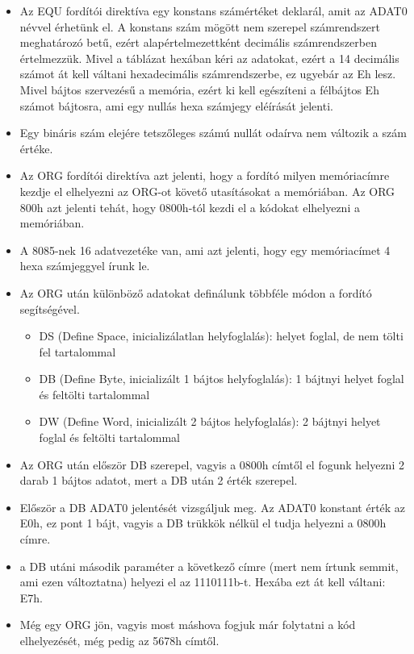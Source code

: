 \documentclass{article}
\begin{document}
\begin{itemize}
	\item Az EQU fordítói direktíva egy konstans számértéket deklarál, amit az ADAT0 névvel érhetünk el. A konstans szám mögött nem szerepel számrendszert meghatározó betű, ezért alapértelmezettként decimális számrendszerben értelmezzük. Mivel a táblázat hexában kéri az adatokat, ezért a 14 decimális számot át kell váltani hexadecimális számrendszerbe, ez ugyebár az Eh lesz. Mivel bájtos szervezésű a memória, ezért ki kell egészíteni a félbájtos Eh számot bájtosra, ami egy nullás hexa számjegy eléírását jelenti.
	\item \colorbox{orange!30}{Egy bináris szám elejére tetszőleges számú nullát odaírva nem változik a szám értéke.}
	\item Az ORG fordítói direktíva azt jelenti, hogy a fordító milyen memóriacímre kezdje el elhelyezni az ORG-ot követő utasításokat a memóriában. Az ORG 800h azt jelenti tehát, hogy 0800h-tól kezdi el a kódokat elhelyezni a memóriában.
	\item \colorbox{orange!30}{A 8085-nek 16 adatvezetéke van, ami azt jelenti, hogy egy memóriacímet 4 hexa számjeggyel írunk le.}
	\item Az ORG után különböző adatokat definálunk többféle módon a fordító segítségével.
	\begin{itemize}
		\item DS (Define Space, inicializálatlan helyfoglalás): helyet foglal, de nem tölti fel tartalommal
		\item DB (Define Byte, inicializált 1 bájtos helyfoglalás): 1 bájtnyi helyet foglal és feltölti tartalommal
		\item DW (Define Word, inicializált 2 bájtos helyfoglalás): 2 bájtnyi helyet foglal és feltölti tartalommal
	\end{itemize}
	\item Az ORG után először DB szerepel, vagyis a 0800h címtől el fogunk helyezni 2 darab 1 bájtos adatot, mert a DB után 2 érték szerepel.
	\item Először a DB ADAT0 jelentését vizsgáljuk meg. Az ADAT0 konstant érték az E0h, ez pont 1 bájt, vagyis a DB trükkök nélkül el tudja helyezni a 0800h címre.
	\item a DB utáni második paraméter a következő címre (mert nem írtunk semmit, ami ezen változtatna) helyezi el az 1110111b-t. Hexába ezt át kell váltani: E7h.
	\item Még egy ORG jön, vagyis most máshova fogjuk már folytatni a kód elhelyezését, még pedig az 5678h címtől.

\end{itemize}
\end{document}
